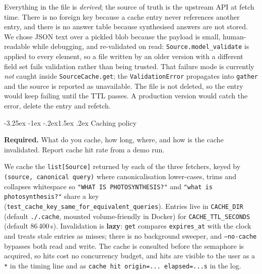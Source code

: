 \documentclass[11pt,a4paper]{article}
\makeatletter
\renewcommand\subsection{\@startsection{subsection}{2}{\z@}%
    {-3.25ex \@plus -1ex \@minus -.2ex}{1.5ex \@plus .2ex}%
    {\normalfont\large\bfseries\color{accent}}}%
\makeatother
\begin{document}
Everything in the file is \emph{derived}; the source of truth is the upstream API at fetch time. There is no foreign key because a cache entry never references another entry, and there is no answer table because synthesised answers are not stored. We chose JSON text over a pickled blob because the payload is small, human-readable while debugging, and re-validated on read: \texttt{Source.model\_validate} is applied to every element, so a file written by an older version with a different field set fails validation rather than being trusted. That failure mode is currently \emph{not} caught inside \texttt{SourceCache.get}; the \texttt{ValidationError} propagates into \texttt{gather} and the source is reported as unavailable. The file is not deleted, so the entry would keep failing until the TTL passes. A production version would catch the error, delete the entry and refetch.

\subsection{Caching policy}

\begin{deliverbox}
\textbf{Required.} What do you cache, how long, where, and how is the cache invalidated. Report cache hit rate from a demo run.
\end{deliverbox}

We cache the \texttt{list[Source]} returned by each of the three fetchers, keyed by \texttt{(source, canonical query)} where canonicalisation lower-cases, trims and collapses whitespace so \texttt{"WHAT IS PHOTOSYNTHESIS?"} and \texttt{"what is photosynthesis?"} share a key (\texttt{test\_cache\_key\_same\_for\_equivalent\_queries}). Entries live in \texttt{CACHE\_DIR} (default \texttt{./.cache}, mounted volume-friendly in Docker) for \texttt{CACHE\_TTL\_SECONDS} (default 86\,400\,s). Invalidation is \textbf{lazy}: \texttt{get} compares \texttt{expires\_at} with the clock and treats stale entries as misses; there is no background sweeper, and \texttt{--no-cache} bypasses both read and write. The cache is consulted before the semaphore is acquired, so hits cost no concurrency budget, and hits are visible to the user as a \texttt{*} in the timing line and as \texttt{cache hit origin=... elapsed=...s} in the log.
\end{document}
